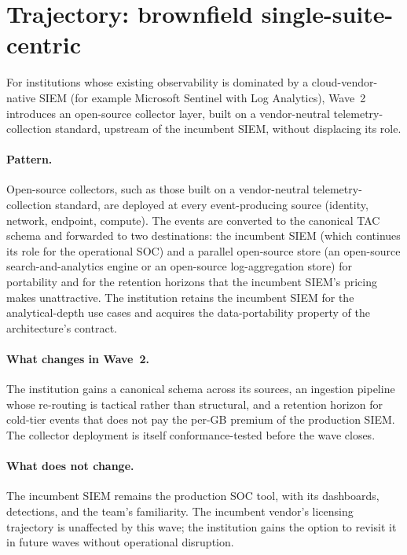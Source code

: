\section{Trajectory: brownfield single-suite-centric}
\label{sec:w2-brownfield-ms}

For institutions whose existing observability is dominated by
a cloud-vendor-native SIEM (for example Microsoft Sentinel with
Log Analytics), Wave~2 introduces an open-source collector layer,
built on a vendor-neutral telemetry-collection standard, upstream
of the incumbent SIEM, without displacing its role.

\paragraph{Pattern.} Open-source collectors, such as those built on
a vendor-neutral telemetry-collection standard, are deployed at
every event-producing source (identity, network, endpoint,
compute). The events are converted to the canonical TAC
schema and forwarded to two destinations: the incumbent SIEM (which
continues its role for the operational SOC) and a
parallel open-source store (an open-source search-and-analytics
engine or an open-source log-aggregation store) for portability and
for the retention horizons that the incumbent SIEM's pricing makes
unattractive. The institution retains the incumbent SIEM for the
analytical-depth use cases and acquires the data-portability
property of the architecture's contract.

\paragraph{What changes in Wave~2.} The institution gains a
canonical schema across its sources, an ingestion pipeline whose
re-routing is tactical rather than structural, and a retention
horizon for cold-tier events that does not pay the per-GB premium
of the production SIEM. The collector deployment is itself
conformance-tested before the wave closes.

\paragraph{What does not change.} The incumbent SIEM remains the
production SOC tool, with its dashboards, detections, and the team's
familiarity. The incumbent vendor's licensing trajectory is
unaffected by this wave; the institution gains the option to revisit it in
future waves without operational disruption.

